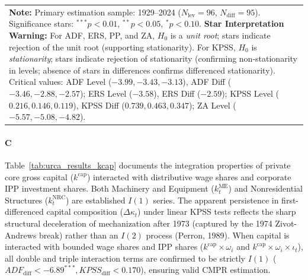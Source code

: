 \begin{landscape}
\begin{table}[h!]
\begin{tabular}{p{5.8cm} p{0.6cm} p{0.6cm} p{1.4cm} p{1.4cm} p{1.4cm} p{1.4cm} p{1.4cm} p{1.4cm} p{2.2cm} p{2.2cm}}
\bottomrule
\multicolumn{11}{p{22.0cm}}{\footnotesize \textbf{Note:} Primary estimation sample: 1929--2024 ($N_{\text{lev}}=96$, $N_{\text{diff}}=95$). Significance stars: $^{***} p < 0.01$, $^{**} p < 0.05$, $^{*} p < 0.10$. \textbf{Star Interpretation Warning:} For ADF, ERS, PP, and ZA, $H_0$ is a \emph{unit root}; stars indicate rejection of the unit root (supporting stationarity). For KPSS, $H_0$ is \emph{stationarity}; stars indicate rejection of stationarity (confirming non-stationarity in levels; absence of stars in differences confirms differenced stationarity). Critical values: ADF Level ($-3.99, -3.43, -3.13$), ADF Diff ($-3.46, -2.88, -2.57$); ERS Level ($-3.58$), ERS Diff ($-2.59$); KPSS Level ($0.216, 0.146, 0.119$), KPSS Diff ($0.739, 0.463, 0.347$); ZA Level ($-5.57, -5.08, -4.82$).}
\end{tabular}
\end{table}
\end{landscape}

\paragraph{C}
Table~\ref{tab:urca_results_kcap} documents the integration properties of private core gross capital ($k^{\text{cap}}$) interacted with distributive wage shares and corporate IPP investment shares. Both Machinery and Equipment ($k^{\text{ME}}_t$) and Nonresidential Structures ($k^{\text{NRC}}_t$) are established $I(1)$ series. The apparent persistence in first-differenced capital composition ($\Delta \kappa_t$) under linear KPSS tests reflects the sharp structural deceleration of mechanization after 1973 (captured by the 1974 Zivot-Andrews break) rather than an $I(2)$ process (Perron, 1989). When capital is interacted with bounded wage shares and IPP shares ($k^{\text{cap}} \times \omega_i$ and $k^{\text{cap}} \times \omega_i \times \iota_t$), all double and triple interaction terms are confirmed to be strictly $I(1)$ ($ADF_{\text{diff}} < -6.89^{***}, KPSS_{\text{diff}} < 0.170$), ensuring valid CMPR estimation.

